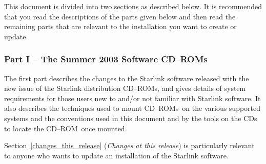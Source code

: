 \documentclass[twoside,11pt]{article}
\newcommand{\htmlref}[2]{#1}
\newcommand{\latexhtml}[2]{#1}
\renewcommand{\_}{\texttt{\symbol{95}}}
\newcommand{\cdrom}{CD--ROM}
\newcommand{\cdrom}{CD-ROM}
\newcommand{\cdroms}{CD--ROMs}
\newcommand{\cdroms}{CD-ROMs}
\begin{document}
This document is divided into two sections as described below.  It is
recommended that you read the descriptions of the parts given below and
then read the remaining parts that are relevant to the installation you
want to create or update.

\subsubsection{Part I -- The Summer 2003 Software \cdroms}

The first part describes the changes to the Starlink software released
with the new issue of the Starlink distribution \cdroms, and gives details
of system requirements for those users new to and/or not familiar with
Starlink software.  It also describes the techniques used to mount \cdroms\
on the various supported systems and the conventions used in this document
and by the tools on the CDs to locate the \cdrom\ once mounted.

\latexhtml{Section~\ref{changes_this_release} (\textit{Changes at this
release}) is particularly relevant to anyone who wants to update an
installation of the Starlink software. }{The
\htmlref{changes}{changes_this_release} section is particularly
relevant to anyone who wants to update an installation of the Starlink
software.}






\end{document}
